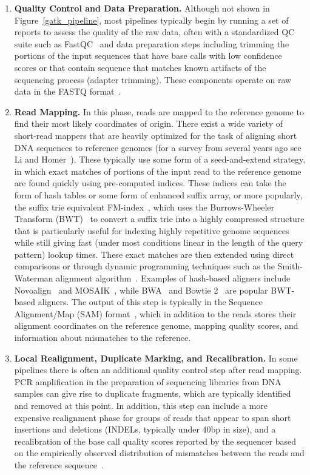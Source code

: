 \begin{enumerate}
\item \textbf{Quality Control and Data Preparation.} Although not shown in Figure~\ref{gatk_pipeline}, most pipelines typically begin by running a set of reports to assess the quality of the raw data, often with a standardized QC suite such as FastQC~\cite{fastqc} and data preparation steps including trimming the portions of the input sequences that have base calls with low confidence scores or that contain sequence that matches known artifacts of the sequencing process (adapter trimming). These components operate on raw data in the FASTQ format~\cite{Cock:2010ky}.

\item \textbf{Read Mapping.} In this phase, reads are mapped to the reference genome to find their most likely coordinates of origin. There exist a wide variety of short-read mappers that are heavily optimized for the task of aligning short DNA sequences to reference genomes (for a survey from several years ago see Li and Homer~\cite{Li:2010p10}). These typically use some form of a seed-and-extend strategy, in which exact matches of portions of the input read to the reference genome are found quickly using pre-computed indices. These indices can take the form of hash tables or some form of enhanced suffix array, or more popularly, the suffix trie equivalent FM-index~\cite{Ferragina:2000vl}, which uses the Burrows-Wheeler Transform (BWT)~\cite{Lossless94ablock-sorting} to convert a suffix trie into a highly compressed structure that is particularly useful for indexing highly repetitive genome sequences while still giving fast (under most conditions linear in the length of the query pattern) lookup times. These exact matches are then extended using direct comparisons or through dynamic programming techniques such as the Smith-Waterman alignment algorithm~\cite{Smith:1981up}. Examples of hash-based aligners include Novoalign~\cite{novoalign} and MOSAIK~\cite{2013arXiv1309.1149L}, while BWA~\cite{Li:2009p836} and Bowtie 2~\cite{Langmead:2012jh} are popular BWT-based aligners. The output of this step is typically in the Sequence Alignment/Map (SAM) format~\cite{Li:2009vz}, which in addition to the reads stores their alignment coordinates on the reference genome, mapping quality scores, and information about mismatches to the reference.

\item \textbf{Local Realignment, Duplicate Marking, and Recalibration.} In some pipelines there is often an additional quality control step after read mapping. PCR amplification in the preparation of sequencing libraries from DNA samples can give rise to duplicate fragments, which are typically identified and removed at this point. In addition, this step can include a more expensive realignment phase for groups of reads that appear to span short insertions and deletions (INDELs, typically under 40bp in size), and a recalibration of the base call quality scores reported by the sequencer based on the empirically observed distribution of mismatches between the reads and the reference sequence~\cite{DePristo:2011fo}.


\end{enumerate}
